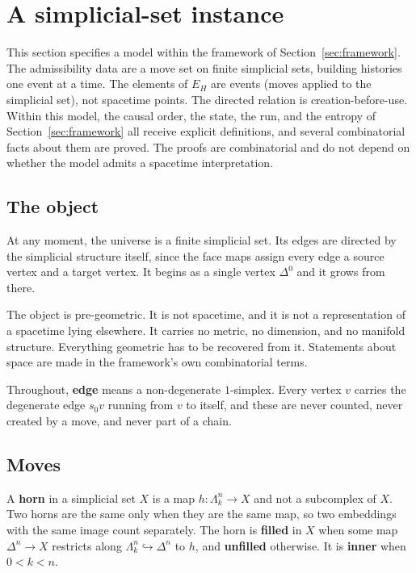\section{A simplicial-set instance}
\label{sec:instance}

This section specifies a model within the framework of
Section~\ref{sec:framework}. The admissibility data are a move set on
finite simplicial sets, building histories one event at a time. The
elements of $E_H$ are events (moves applied to the simplicial set), not
spacetime points. The directed relation is creation-before-use. Within
this model, the causal order, the state, the run, and the entropy of
Section~\ref{sec:framework} all receive explicit definitions, and several
combinatorial facts about them are proved. The proofs are combinatorial
and do not depend on whether the model admits a spacetime interpretation.

\subsection{The object}

At any moment, the universe is a finite simplicial set.
Its edges are directed by the simplicial structure itself, since the face maps assign every edge a source vertex and a target vertex.
It begins as a single vertex $\Delta^0$ and it grows from there.

The object is pre-geometric.
It is not spacetime, and it is not a representation of a spacetime lying elsewhere.
It carries no metric, no dimension, and no manifold structure.
Everything geometric has to be recovered from it.
Statements about space are made in the framework's own combinatorial terms.

Throughout, \textbf{edge} means a non-degenerate $1$-simplex.
Every vertex $v$ carries the degenerate edge $s_0 v$ running from $v$ to itself, and these are never counted, never created by a move, and never part of a chain.

\subsection{Moves}

\begin{definition}
\label{def:horn}
A \textbf{horn} in a simplicial set $X$ is a map $h : \Lambda^n_k \to X$ and not a subcomplex of $X$.
Two horns are the same only when they are the same map, so two embeddings with the same image count separately.
The horn is \textbf{filled} in $X$ when some map $\Delta^n \to X$ restricts along $\Lambda^n_k \hookrightarrow \Delta^n$ to $h$, and \textbf{unfilled} otherwise.
It is \textbf{inner} when $0 < k < n$.
\end{definition}

